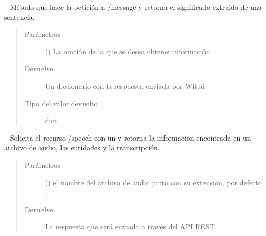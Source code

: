 \begin{fulllineitems}
\begin{fulllineitems}
\begin{fulllineitems}
\label{\detokenize{chapter_two/desc_cloudnao:app.tpa_client_libraries.wit_api.WitAPI.message}}~
Método que hace la petición  a /message y retorna el significado
extraido de una sentencia.
\begin{quote}\begin{description}
\item[{Parámetros}] \leavevmode
{} () \textendash{} La oración de la que se desea obtener información.

\item[{Devuelve}] \leavevmode
Un diccionario con la respuesta enviada por Wit.ai

\item[{Tipo del valor devuelto}] \leavevmode
dict

\end{description}\end{quote}

\end{fulllineitems}


\begin{fulllineitems}
\label{\detokenize{chapter_two/desc_cloudnao:app.tpa_client_libraries.wit_api.WitAPI.speech}}~
Solicita el recurso /speech con un  y retorna la información
encontrada en un archivo de audio, las entidades y la transcripción.
\begin{quote}\begin{description}
\item[{Parámetros}] \leavevmode
{} () \textendash{} el nombre del archivo de audio junto con su extensión, por defecto .

\item[{Devuelve}] \leavevmode
La respuesta que será enviada a través del API REST.

\end{description}\end{quote}

\end{fulllineitems}


\end{fulllineitems}




\end{fulllineitems}
